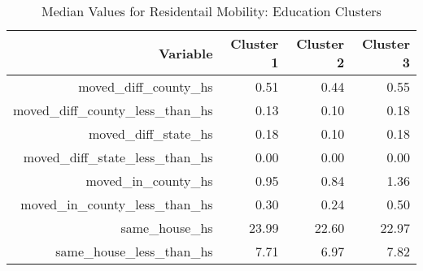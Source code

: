 \begin{table}[ht]
    \centering
    \caption{Median Values for Residentail Mobility: Education Clusters}
    \label{tab:trans_edu}
    \begin{tabular}{|r|r|r|r|}
      \hline
     Variable & Cluster 1 & Cluster 2 & Cluster 3 \\ 
      \hline
    moved\_diff\_county\_hs & 0.51 & 0.44 & 0.55 \\ 
    \hline
      moved\_diff\_county\_less\_than\_hs & 0.13 & 0.10 & 0.18 \\ 
      \hline
      moved\_diff\_state\_hs & 0.18 & 0.10 & 0.18 \\
      \hline 
      moved\_diff\_state\_less\_than\_hs & 0.00 & 0.00 & 0.00 \\
      \hline 
      moved\_in\_county\_hs & 0.95 & 0.84 & 1.36 \\ 
      \hline
      moved\_in\_county\_less\_than\_hs & 0.30 & 0.24 & 0.50 \\ 
      \hline
      same\_house\_hs & 23.99 & 22.60 & 22.97 \\ 
      \hline
      same\_house\_less\_than\_hs & 7.71 & 6.97 & 7.82 \\ 
       \hline
    \end{tabular}
    \end{table}